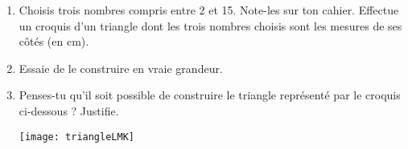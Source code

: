 
\begin{activite}

\begin{enumerate}
\item Choisis trois nombres compris entre 2 et 15. Note-les sur ton cahier. Effectue un croquis d'un triangle dont les trois nombres choisis sont les mesures de ses côtés (en cm).

\item Essaie de le construire en vraie grandeur.

\item Penses-tu qu'il soit possible de construire le triangle représenté par le croquis ci-dessous ? Justifie.

\begin{center} \texttt{[image: triangleLMK]} \end{center}
\end{enumerate}

\end{activite}


